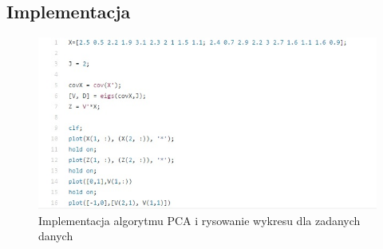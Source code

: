 \documentclass{article}
\begin{document}
\newpage

\subsection{Implementacja}
\begin{figure}[H]
\centering

\includegraphics[scale=0.7]{IO_obrazy/kodzad2.jpg}
\caption{Implementacja algorytmu PCA i rysowanie wykresu dla zadanych danych}
\end{figure}



\end{document}

